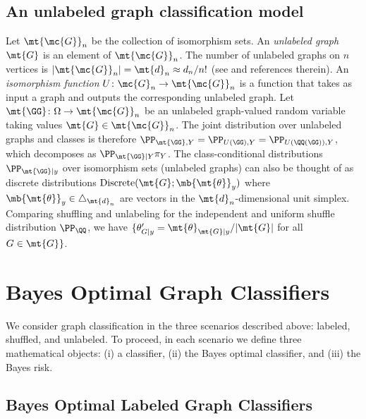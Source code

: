 \documentclass[10pt,journal,cspaper,compsoc]{IEEEtran}
\begin{document}
\subsection{An unlabeled graph classification model} %
\label{sub:an_unlabeled_graph_classification_model}


Let $\mt{\mc{G}}_n$ be the collection of isomorphism sets.
An \emph{unlabeled graph} $\mt{G}$ is an element of $\mt{\mc{G}}_n$. The number of unlabeled graphs on $n$ vertices is $|\mt{\mc{G}}_n|=\mt{d}_n \approx d_n/n!$ (see \cite{A000088} and references therein).
An \emph{isomorphism function} $U\colon \mc{G}_n \to \mt{\mc{G}}_n$ is a function that takes as input a graph and outputs the corresponding unlabeled graph. Let $\mt{\GG}\colon \Omega \to \mt{\mc{G}}_n$ be an unlabeled graph-valued random variable taking values $\mt{G} \in \mt{\mc{G}}_n$.   The joint distribution over unlabeled graphs and classes is therefore
$\PP_{\mt{\GG},Y}=\PP_{U(\GG),Y}=\PP_{U(\QQ(\GG)),Y}$, which decomposes as $\PP_{\mt{\GG}|Y} \pi_Y$. The class-conditional distributions $\PP_{\mt{\GG} | y}$ over isomorphism sets (unlabeled graphs) can also be thought of as discrete distributions $\text{Discrete}(\mt{G}; \mb{\mt{\theta}}_y)$ where $\mb{\mt{\theta}}_y\in \triangle_{\mt{d}_n}$ are vectors in the $\mt{d}_n$-dimensional unit simplex.   Comparing shuffling and unlabeling for the independent and uniform shuffle distribution $\PP_{\QQ}$, we have $\{\theta_{G|y}'=\mt{\theta}_{\mt{G}|y}/|\mt{G}|$ for all $G \in \mt{G}\}$.  




\section{Bayes Optimal Graph Classifiers} %
\label{sec:bayes_optimal_graph_classifiers}

We consider graph classification in the three scenarios described above: labeled, shuffled, and unlabeled.  To proceed, in each scenario we define three mathematical objects: (i) a classifier, (ii) the Bayes optimal classifier, and (iii) the Bayes risk.

\subsection{Bayes Optimal Labeled Graph Classifiers} %
\label{sub:labeled_graph_classifiers}
\end{document}
